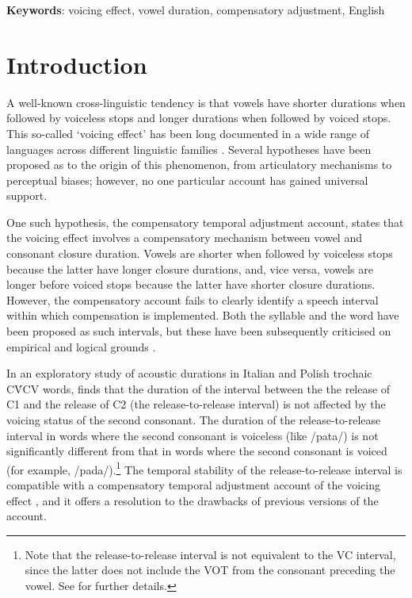 \documentclass[12pt,a4paper,]{article}
\begin{document}
\textbf{Keywords}: voicing effect, vowel duration, compensatory
adjustment, English

\hypertarget{introduction}{%
\section{Introduction}\label{introduction}}

\label{s:intro}

A well-known cross-linguistic tendency is that vowels have shorter
durations when followed by voiceless stops and longer durations when
followed by voiced stops. This so-called `voicing effect' has been long
documented in a wide range of languages across different linguistic
families \citep{maddieson1976, begus2017}. Several hypotheses have been
proposed as to the origin of this phenomenon, from articulatory
mechanisms to perceptual biases; however, no one particular account has
gained universal support.

One such hypothesis, the compensatory temporal adjustment account,
states that the voicing effect involves a compensatory mechanism between
vowel and consonant closure duration. Vowels are shorter when followed
by voiceless stops because the latter have longer closure durations,
and, vice versa, vowels are longer before voiced stops because the
latter have shorter closure durations. However, the compensatory account
fails to clearly identify a speech interval within which compensation is
implemented. Both the syllable \citep{lindblom1967, farnetani1986} and
the word \citep{slis1969a, slis1969b, lehiste1970a, lehiste1970b} have
been proposed as such intervals, but these have been subsequently
criticised on empirical and logical grounds
\citep{chen1970, jacewicz2009, maddieson1976, coretta2019k}.

In an exploratory study of acoustic durations in Italian and Polish
trochaic CV́CV words, \citet{coretta2019k} finds that the duration of the
interval between the the release of C1 and the release of C2 (the
release-to-release interval) is not affected by the voicing status of
the second consonant. The duration of the release-to-release interval in
words where the second consonant is voiceless (like /pata/) is not
significantly different from that in words where the second consonant is
voiced (for example,
/pada/).\footnote{Note that the release-to-release interval is not equivalent to the VC interval, since the latter does not include the VOT from the consonant preceding the vowel. See \citet{coretta2019k} for further details.}
The temporal stability of the release-to-release interval is compatible
with a compensatory temporal adjustment account of the voicing effect
\citep{lindblom1967, slis1969a, slis1969b, lehiste1970a, lehiste1970b},
and it offers a resolution to the drawbacks of previous versions of the
account.
\end{document}
